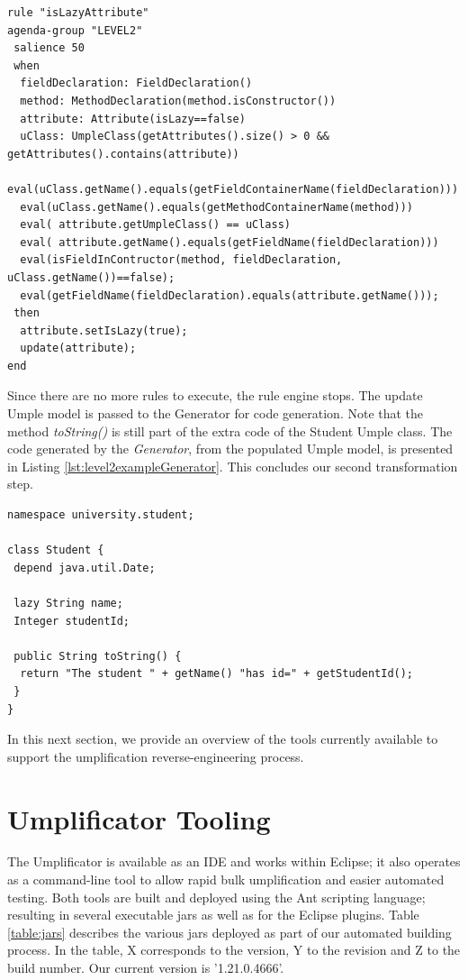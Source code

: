 \begin{lstlisting}[language={drools},label=lst:isLazyAttribute, caption=Rule isLazyAttribute]
rule "isLazyAttribute"
agenda-group "LEVEL2" 
 salience 50
 when
  fieldDeclaration: FieldDeclaration()
  method: MethodDeclaration(method.isConstructor())
  attribute: Attribute(isLazy==false)
  uClass: UmpleClass(getAttributes().size() > 0 && 							      getAttributes().contains(attribute))
  eval(uClass.getName().equals(getFieldContainerName(fieldDeclaration)))
  eval(uClass.getName().equals(getMethodContainerName(method)))
  eval( attribute.getUmpleClass() == uClass) 
  eval( attribute.getName().equals(getFieldName(fieldDeclaration))) 
  eval(isFieldInContructor(method, fieldDeclaration, uClass.getName())==false);
  eval(getFieldName(fieldDeclaration).equals(attribute.getName()));
 then
  attribute.setIsLazy(true);
  update(attribute);
end
\end{lstlisting}

Since there are no more rules to execute, the rule engine stops. The update Umple model is passed to the Generator for code generation. Note that the method \textit{toString()} is still part of the extra code of the Student Umple class.
The code generated by the \textit{Generator}, from the populated Umple model, is presented in Listing \ref{lst:level2exampleGenerator}. This concludes our second transformation step.

\begin{lstlisting}[style=umpleOut, label=lst:level2exampleGenerator, caption=Umple code generated -- Level 2]
namespace university.student;

class Student {
 depend java.util.Date;
	
 lazy String name;
 Integer studentId;
       
 public String toString() {
  return "The student " + getName() "has id=" + getStudentId();
 }
}   
\end{lstlisting}

In this next section, we provide an overview of the tools currently available to support the umplification reverse-engineering process.

\section{Umplificator Tooling}

The Umplificator is available as an IDE and works within Eclipse; it also operates as a command-line tool to allow rapid bulk umplification and easier automated testing. Both tools are built and deployed using the Ant scripting language; resulting in several executable jars as well as for the Eclipse plugins. Table \ref{table:jars} describes the various jars deployed as part of our automated building process. In the table, X corresponds to the version, Y to the revision and Z to the build number. Our current version is '1.21.0.4666'.

